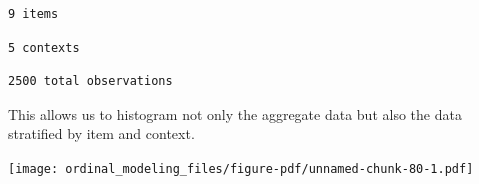 \documentclass[
  letterpaper,
  DIV=11,
  numbers=noendperiod]{scrartcl}
\newenvironment{Shaded}{\begin{snugshade}}{\end{snugshade}}
\newcommand{\AttributeTok}[1]{\textcolor[rgb]{0.40,0.45,0.13}{#1}}
\newcommand{\DecValTok}[1]{\textcolor[rgb]{0.68,0.00,0.00}{#1}}
\newcommand{\FloatTok}[1]{\textcolor[rgb]{0.68,0.00,0.00}{#1}}
\newcommand{\FunctionTok}[1]{\textcolor[rgb]{0.28,0.35,0.67}{#1}}
\newcommand{\NormalTok}[1]{\textcolor[rgb]{0.00,0.23,0.31}{#1}}
\newcommand{\SpecialCharTok}[1]{\textcolor[rgb]{0.37,0.37,0.37}{#1}}
\newcommand{\StringTok}[1]{\textcolor[rgb]{0.13,0.47,0.30}{#1}}
\begin{document}
\begin{verbatim}
9 items
\end{verbatim}

\begin{Shaded}
\end{Shaded}

\begin{verbatim}
5 contexts
\end{verbatim}

\begin{Shaded}
\end{Shaded}

\begin{verbatim}
2500 total observations
\end{verbatim}

This allows us to histogram not only the aggregate data but also the
data stratified by item and context.

\begin{Shaded}
\end{Shaded}

\texttt{[image: ordinal\_modeling\_files/figure-pdf/unnamed-chunk-80-1.pdf]}
\end{document}
